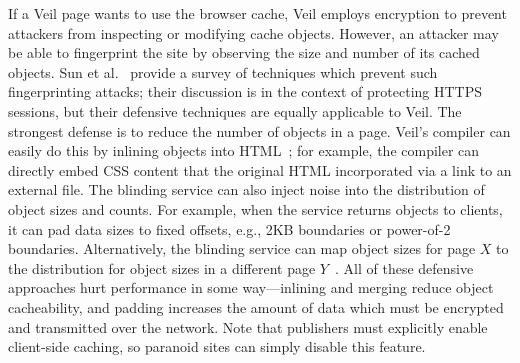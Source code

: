 If a Veil page wants to use the browser cache, Veil
employs encryption to prevent attackers from inspecting
or modifying cache objects. However, an attacker may
be able to fingerprint the site by observing the size
and number of its cached objects. Sun et al.~\cite{sun02} provide a
survey of techniques which prevent such fingerprinting attacks; 
their discussion is in the context of
protecting HTTPS sessions, but their defensive
techniques are equally applicable to Veil. The strongest
defense is to reduce the number of objects in a page.
Veil's compiler can easily do this by inlining objects
into HTML~\cite{silo}; for example, the compiler can
directly embed CSS content that the original HTML
incorporated via a link to an external file. The blinding
service can also inject noise into the distribution of object
sizes and counts. For example, when the service returns
objects to clients, it can pad data sizes to fixed offsets,
e.g., 2KB boundaries or power-of-2 boundaries. Alternatively,
the blinding service can map object sizes for page $X$ to
the distribution for object sizes in a different page
$Y$~\cite{wright09}. All of these defensive approaches
hurt performance in some way---inlining and merging
reduce object cacheability, and padding increases the
amount of data which must be encrypted and transmitted
over the network. Note that publishers must explicitly
enable client-side caching, so paranoid sites can simply
disable this feature.

